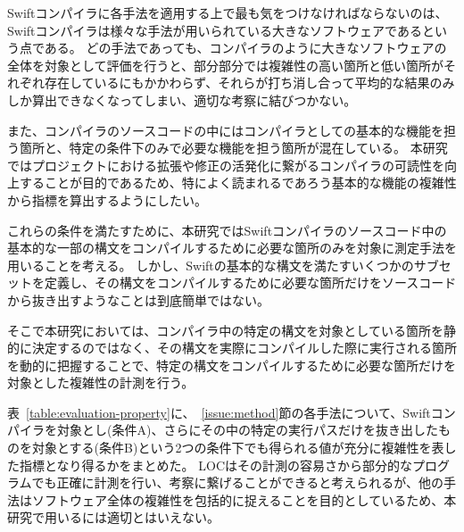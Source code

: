 Swiftコンパイラに各手法を適用する上で最も気をつけなければならないのは、Swiftコンパイラは様々な手法が用いられている大きなソフトウェアであるという点である。
どの手法であっても、コンパイラのように大きなソフトウェアの全体を対象として評価を行うと、部分部分では複雑性の高い箇所と低い箇所がそれぞれ存在しているにもかかわらず、それらが打ち消し合って平均的な結果のみしか算出できなくなってしまい、適切な考察に結びつかない。

また、コンパイラのソースコードの中にはコンパイラとしての基本的な機能を担う箇所と、特定の条件下のみで必要な機能を担う箇所が混在している。
本研究ではプロジェクトにおける拡張や修正の活発化に繋がるコンパイラの可読性を向上することが目的であるため、特によく読まれるであろう基本的な機能の複雑性から指標を算出するようにしたい。

これらの条件を満たすために、本研究ではSwiftコンパイラのソースコード中の基本的な一部の構文をコンパイルするために必要な箇所のみを対象に測定手法を用いることを考える。
しかし、Swiftの基本的な構文を満たすいくつかのサブセットを定義し、その構文をコンパイルするために必要な箇所だけをソースコードから抜き出すようなことは到底簡単ではない。

そこで本研究においては、コンパイラ中の特定の構文を対象としている箇所を静的に決定するのではなく、その構文を実際にコンパイルした際に実行される箇所を動的に把握することで、特定の構文をコンパイルするために必要な箇所だけを対象とした複雑性の計測を行う。

表~\ref{table:evaluation-property}に、~\ref{issue:method}節の各手法について、Swiftコンパイラを対象とし(条件A)、さらにその中の特定の実行パスだけを抜き出したものを対象とする(条件B)という2つの条件下でも得られる値が充分に複雑性を表した指標となり得るかをまとめた。
LOCはその計測の容易さから部分的なプログラムでも正確に計測を行い、考察に繋げることができると考えられるが、他の手法はソフトウェア全体の複雑性を包括的に捉えることを目的としているため、本研究で用いるには適切とはいえない。

